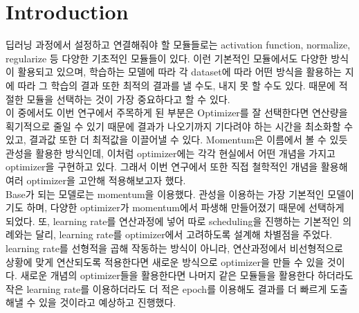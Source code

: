 \documentclass{article}
\begin{document}
\section{Introduction}
딥러닝 과정에서 설정하고 연결해줘야 할 모듈들로는 activation function, normalize, regularize 등 다양한 기초적인 모듈들이 있다. 이런 기본적인 모듈에서도 다양한 방식이 활용되고 있으며, 학습하는 모델에 따라 각 dataset에 따라 어떤 방식을 활용하는 지에 따라 그 학습의 결과 또한 최적의 결과를 낼 수도, 내지 못 할 수도 있다. 때문에 적절한 모듈을 선택하는 것이 가장 중요하다고 할 수 있다.\\
이 중에서도 이번 연구에서 주목하게 된 부분은 Optimizer를 잘 선택한다면 연산량을 획기적으로 줄일 수 있기 때문에 결과가 나오기까지 기다려야 하는 시간을 최소화할 수 있고, 결과값 또한 더 최적값을 이끌어낼 수 있다. Momentum은 이름에서 볼 수 있듯 관성을 활용한 방식인데, 이처럼 optimizer에는 각각 현실에서 어떤 개념을 가지고 optimizer을 구현하고 있다. 그래서 이번 연구에서 또한 직접 철학적인 개념을 활용해 여러 optimizer을 고안해 적용해보고자 했다.\\
Base가 되는 모델로는 momentum을 이용했다. 관성을 이용하는 가장 기본적인 모델이기도 하며, 다양한 optimizer가 momentum에서 파생해 만들어졌기 때문에 선택하게 되었다. 또, learning rate를 연산과정에 넣어 따로 scheduling을 진행하는 기본적인 의례와는 달리, learning rate를 optimizer에서 고려하도록 설계해 차별점을 주었다. learning rate를 선형적을 곱해 작동하는 방식이 아니라, 연산과정에서 비선형적으로 상황에 맞게 연산되도록 적용한다면 새로운 방식으로 optimizer을 만들 수 있을 것이다. 새로운 개념의 optimizer들을 활용한다면 나머지 같은 모듈들을 활용한다 하더라도 작은 learning rate를 이용하더라도 더 적은 epoch를 이용해도 결과를 더 빠르게 도출해낼 수 있을 것이라고 예상하고 진행했다.\\
\end{document}
